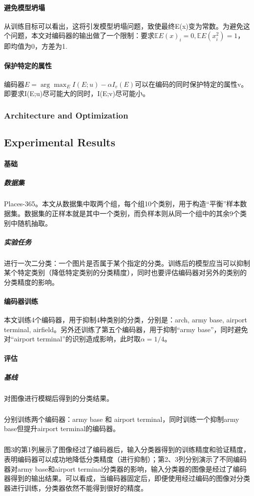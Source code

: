 \documentclass[12pt,a4paper]{article}
\begin{document}
	\paragraph{避免模型坍塌} 从训练目标可以看出，这将引发模型坍塌问题，致使最终E(x)变为常数。为避免这个问题，本文对编码器的输出做了一个限制：要求$\mathbb{E}E(x)_i = 0, \mathbb{E}E(x_i^2) = 1$，即均值为0，方差为1.
	\paragraph{保护特定的属性} 编码器$E = \arg\max_E I(E;u)-\alpha I_v(E)$可以在编码的同时保护特定的属性v。即要求I(E;u)尽可能大的同时，I(E;v)尽可能小。
\subsubsection{Architecture and Optimization}

\subsection{Experimental Results}
\paragraph{基础}
\subparagraph{数据集} Places-365。本文从数据集中取两个组，每个组10个类别，用于构造“平衡”样本数据集。数据集的正样本就是其中一个类别，而负样本则从同一个组中的其余9个类别中随机抽取。
\subparagraph{实验任务} 进行一次二分类：一个图片是否属于某个指定的分类。训练后的模型应当可以抑制某个特定类别（降低特定类别的分类精度），同时也要评估编码器对另外的类别的分类精度的影响。

\paragraph{编码器训练} 本文训练4个编码器，用于抑制4种类别的分类，分别是：arch, army base, airport terminal, airfield。另外还训练了第五个编码器，用于抑制“army base”，同时避免对“airport terminal”的识别造成影响，此时取$\alpha=1/4$。
\paragraph{评估}
\subparagraph{基线} 对图像进行模糊后得到的分类结果。
\subparagraph{} 分别训练两个编码器：army base 和 airport terminal，同时训练一个抑制army base但提升airport terminal的编码器。
\subparagraph{} 图3的第1列展示了图像经过了编码器后，输入分类器得到的训练精度和验证精度，表明编码器可以成功地降低分类精度（进行抑制）；第2、3列分别演示了不同编码器对army base和airport terminal分类器的影响，输入分类器的图像是经过了编码器得到的输出结果。可以看成，当编码器固定后，即便使用经过编码的图像对分类器进行训练，分类器依然不能得到很好的精度。
\end{document}
